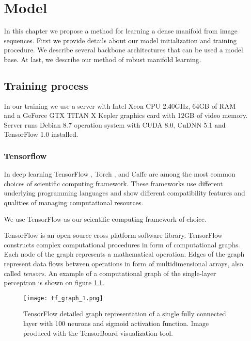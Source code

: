 
\chapter{Model}\label{ch:mode}

In this chapter we propose a method for learning a dense manifold from image sequences.
First we provide details about our model initialization and training procedure.
We describe several backbone architectures that can be used a model base.
At last, we describe our method of robust manifold learning.


\section{Training process}

In our training we use a server with Intel Xeon CPU 2.40GHz, 64GB of RAM and a GeForce GTX TITAN X Kepler graphics card with 12GB of video memory. Server runs Debian 8.7 operation system with CUDA 8.0, CuDNN 5.1 and TensorFlow 1.0 installed.

\subsection{Tensorflow}

In deep learning TensorFlow \cite{GoogleResearch2015, Abadi2016}, Torch \cite{torch}, and Caffe \cite{jia2014caffe} are among the most common choices of scientific computing framework.
These frameworks use different underlying programming languages and show different compatibility features and qualities of managing computational resources.

We use TensorFlow as our scientific computing framework of choice.

TensorFlow is an open source cross platform software library.
TensorFlow constructs complex computational procedures in form of computational graphs.
Each node of the graph represents a mathematical operation.
Edges of the graph represent data flows between operations in form of multidimensional arrays, also called \textit{tensors}.
An example of a computational graph of the single-layer perceptron is shown on figure \ref{fig:tf_graph}.

\begin{figure}[h!]
  \centering
    \texttt{[image: tf\_graph\_1.png]}
  \caption{TensorFlow detailed graph representation of a single fully connected layer with 100 neurons and sigmoid activation function. Image produced with the TensorBoard visualization tool.}
  \label{fig:tf_graph}
\end{figure}

